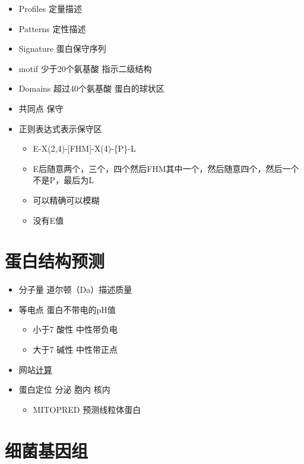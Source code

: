 \documentclass[]{book}
\providecommand{\tightlist}{%
  \setlength{\itemsep}{0pt}\setlength{\parskip}{0pt}}
\begin{document}
\begin{itemize}
\tightlist
\item
  Profiles 定量描述
\item
  Patterns 定性描述
\item
  Signature 蛋白保守序列
\item
  motif 少于20个氨基酸 指示二级结构
\item
  Domains 超过40个氨基酸 蛋白的球状区
\item
  共同点 保守
\item
  正则表达式表示保守区

  \begin{itemize}
  \tightlist
  \item
    E-X(2,4)-{[}FHM{]}-X(4)-\{P\}-L
  \item
    E后随意两个，三个，四个然后FHM其中一个，然后随意四个，然后一个不是P，最后为L
  \item
    可以精确可以模糊
  \item
    没有E值
  \end{itemize}
\end{itemize}

\hypertarget{ux86cbux767dux7ed3ux6784ux9884ux6d4b}{%
\section{蛋白结构预测}\label{ux86cbux767dux7ed3ux6784ux9884ux6d4b}}

\begin{itemize}
\tightlist
\item
  分子量 道尔顿（Da）描述质量
\item
  等电点 蛋白不带电的pH值

  \begin{itemize}
  \tightlist
  \item
    小于7 酸性 中性带负电
  \item
    大于7 碱性 中性带正点
  \end{itemize}
\item
  网站\href{http://web.expasy.org/compute_pi/}{计算}
\item
  蛋白定位 分泌 胞内 核内

  \begin{itemize}
  \tightlist
  \item
    MITOPRED 预测线粒体蛋白
  \end{itemize}
\end{itemize}

\hypertarget{ux7ec6ux83ccux57faux56e0ux7ec4}{%
\section{细菌基因组}\label{ux7ec6ux83ccux57faux56e0ux7ec4}}
\end{document}
